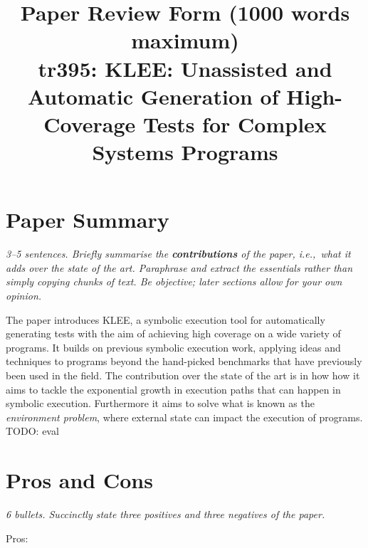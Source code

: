 \documentclass[11pt]{article}
\begin{document}

\title{Paper Review Form (1000 words maximum)\\
    tr395: KLEE: Unassisted and Automatic Generation of High-Coverage Tests for Complex Systems Programs \cite{KLEE}}

\maketitle

\section*{Paper Summary}

\textsl{3--5 sentences. Briefly summarise the {\bf contributions} of the paper,
i.e.,~what it adds over the state of the art. Paraphrase and extract the
essentials rather than simply copying chunks of text. Be objective; later
sections allow for your own opinion.}

The paper introduces KLEE, a symbolic execution tool for automatically
generating tests with the aim of achieving high coverage on a wide variety of
programs. It builds on previous symbolic execution work, applying ideas and
techniques to programs beyond the hand-picked benchmarks that have previously
been used in the field. The contribution over the state of the art is in how
how it aims to tackle the exponential growth in execution paths that can happen
in symbolic execution. Furthermore it aims to solve what is known as the
\textit{environment problem}, where external state can impact the execution of
programs. TODO: eval


\section*{Pros and Cons}

\textsl{6 bullets. Succinctly state three positives and three negatives of the
paper.}

Pros:
\end{document}
